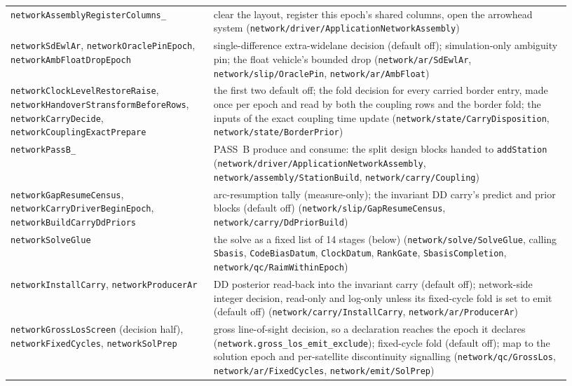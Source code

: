 \documentclass[main.tex]{subfiles}
\begin{document}
{\begin{longtable}{@{}>{\raggedright\arraybackslash}p{0.335\linewidth}>{\raggedright\arraybackslash}p{0.595\linewidth}@{}}
\texttt{networkAssembly\-RegisterColumns\_} & clear the layout, register this epoch's shared columns, open the arrowhead system (\texttt{network/driver/ApplicationNetworkAssembly}) \\
\texttt{networkSdEwlAr}, \texttt{networkOraclePinEpoch}, \texttt{networkAmbFloatDropEpoch} & single-difference extra-widelane decision (default off); simulation-only ambiguity pin; the float vehicle's bounded drop (\texttt{network/ar/SdEwlAr}, \texttt{network/slip/OraclePin}, \texttt{network/ar/AmbFloat}) \\
\texttt{networkClockLevelRestoreRaise}, \texttt{networkHandover\-StransformBeforeRows}, \texttt{networkCarryDecide}, \texttt{networkCouplingExactPrepare} & the first two default off; the fold decision for every carried border entry, made once per epoch and read by both the coupling rows and the border fold; the inputs of the exact coupling time update (\texttt{network/state/CarryDisposition}, \texttt{network/state/BorderPrior}) \\
\texttt{networkPassB\_} & PASS~B produce and consume: the split design blocks handed to \texttt{addStation} (\texttt{network/driver/ApplicationNetworkAssembly}, \texttt{network/assembly/StationBuild}, \texttt{network/carry/Coupling}) \\
\texttt{networkGapResumeCensus}, \texttt{networkCarryDriverBeginEpoch}, \texttt{networkBuildCarryDdPriors} & arc-resumption tally (measure-only); the invariant DD carry's predict and prior blocks (default off) (\texttt{network/slip/GapResumeCensus}, \texttt{network/carry/DdPriorBuild}) \\
\texttt{networkSolveGlue} & the solve as a fixed list of 14 stages (below) (\texttt{network/solve/SolveGlue}, calling \texttt{Sbasis}, \texttt{CodeBiasDatum}, \texttt{ClockDatum}, \texttt{RankGate}, \texttt{SbasisCompletion}, \texttt{network/qc/RaimWithinEpoch}) \\
\texttt{networkInstallCarry}, \texttt{networkProducerAr} & DD posterior read-back into the invariant carry (default off); network-side integer decision, read-only and log-only unless its fixed-cycle fold is set to emit (default off) (\texttt{network/carry/InstallCarry}, \texttt{network/ar/ProducerAr}) \\
\texttt{networkGrossLosScreen} (decision half), \texttt{networkFixedCycles}, \texttt{networkSolPrep} & gross line-of-sight decision, so a declaration reaches the epoch it declares (\texttt{network.gross\_los\_emit\_exclude}); fixed-cycle fold (default off); map to the solution epoch and per-satellite discontinuity signalling (\texttt{network/qc/GrossLos}, \texttt{network/ar/FixedCycles}, \texttt{network/emit/SolPrep}) \\

\end{longtable}}
\end{document}
